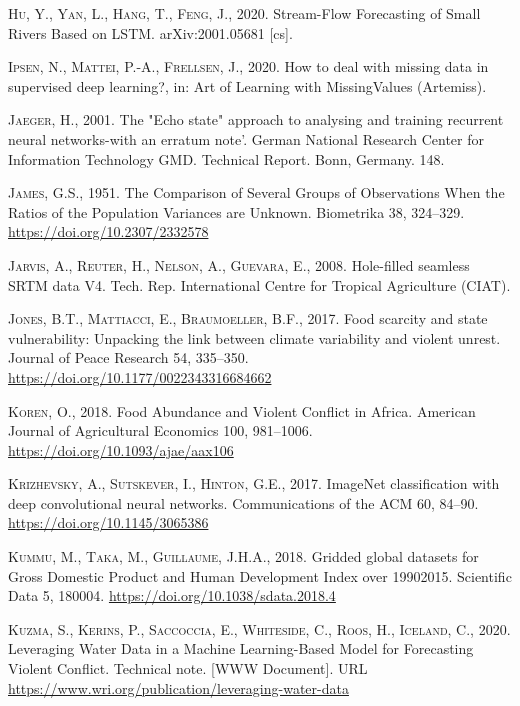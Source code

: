 \documentclass[a4paper,11pt]{article}
\begin{document}
\leavevmode\hypertarget{ref-hu2020}{}%
\textsc{Hu, Y., Yan, L., Hang, T., Feng, J.}, 2020. Stream-Flow Forecasting of Small Rivers Based on LSTM. arXiv:2001.05681 {[}cs{]}.

\leavevmode\hypertarget{ref-ipsen2020}{}%
\textsc{Ipsen, N., Mattei, P.-A., Frellsen, J.}, 2020. How to deal with missing data in supervised deep learning?, in: Art of Learning with MissingValues (Artemiss).

\leavevmode\hypertarget{ref-jaeger2001}{}%
\textsc{Jaeger, H.}, 2001. The "Echo state" approach to analysing and training recurrent neural networks-with an erratum note'. German National Research Center for Information Technology GMD. Technical Report. Bonn, Germany. 148.

\leavevmode\hypertarget{ref-james1951}{}%
\textsc{James, G.S.}, 1951. The Comparison of Several Groups of Observations When the Ratios of the Population Variances are Unknown. Biometrika 38, 324--329. \url{https://doi.org/10.2307/2332578}

\leavevmode\hypertarget{ref-jarvis2008}{}%
\textsc{Jarvis, A., Reuter, H., Nelson, A., Guevara, E.}, 2008. Hole-filled seamless SRTM data V4. Tech. Rep. International Centre for Tropical Agriculture (CIAT).

\leavevmode\hypertarget{ref-jones2017}{}%
\textsc{Jones, B.T., Mattiacci, E., Braumoeller, B.F.}, 2017. Food scarcity and state vulnerability: Unpacking the link between climate variability and violent unrest. Journal of Peace Research 54, 335--350. \url{https://doi.org/10.1177/0022343316684662}

\leavevmode\hypertarget{ref-koren2018}{}%
\textsc{Koren, O.}, 2018. Food Abundance and Violent Conflict in Africa. American Journal of Agricultural Economics 100, 981--1006. \url{https://doi.org/10.1093/ajae/aax106}

\leavevmode\hypertarget{ref-krizhevsky2017}{}%
\textsc{Krizhevsky, A., Sutskever, I., Hinton, G.E.}, 2017. ImageNet classification with deep convolutional neural networks. Communications of the ACM 60, 84--90. \url{https://doi.org/10.1145/3065386}

\leavevmode\hypertarget{ref-kummu2018}{}%
\textsc{Kummu, M., Taka, M., Guillaume, J.H.A.}, 2018. Gridded global datasets for Gross Domestic Product and Human Development Index over 19902015. Scientific Data 5, 180004. \url{https://doi.org/10.1038/sdata.2018.4}

\leavevmode\hypertarget{ref-kuzma2020}{}%
\textsc{Kuzma, S., Kerins, P., Saccoccia, E., Whiteside, C., Roos, H., Iceland, C.}, 2020. Leveraging Water Data in a Machine Learning-Based Model for Forecasting Violent Conflict. Technical note. {[}WWW Document{]}. URL \url{https://www.wri.org/publication/leveraging-water-data}
\end{document}
